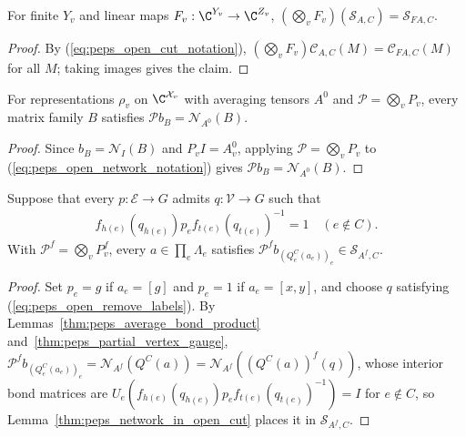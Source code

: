 \begin{lemma}%
    \label{thm:peps_cut_space_physical_image}
    \leanok
    For finite $Y_v$ and linear maps $F_v:\C^{Y_v}\to\C^{Z_v}$,
    $(\bigotimes_v F_v)(\mathcal S_{A,C})=\mathcal S_{FA,C}$.
\end{lemma}
\begin{proof}\leanok
    By (\ref{eq:peps_open_cut_notation}),
    $(\bigotimes_vF_v)\mathcal C_{A,C}(M)=\mathcal C_{FA,C}(M)$ for all $M$;
    taking images gives the claim.
\end{proof}

\begin{lemma}%
    \label{thm:peps_average_bond_product}
    \leanok
    For representations $\rho_v$ on $\C^{\mathcal X_v}$ with averaging tensors
    $A^0$ and $\mathcal P=\bigotimes_v P_v$, every matrix family $B$ satisfies
    $\mathcal P b_B=\mathcal N_{A^0}(B)$.
\end{lemma}
\begin{proof}\leanok
    Since $b_B=\mathcal N_I(B)$ and $P_vI=A_v^0$, applying
    $\mathcal P=\bigotimes_vP_v$ to (\ref{eq:peps_open_network_notation}) gives
    $\mathcal P b_B=\mathcal N_{A^0}(B)$.
\end{proof}

\begin{lemma}%
    \label{thm:peps_open_product_in_cut}
    \leanok
    Suppose that every $p:\mathcal E\to G$ admits $q:\mathcal V\to G$
    such that
    \begin{align}
        f_{h(e)}(q_{h(e)})p_e f_{t(e)}(q_{t(e)})^{-1}=1
        \quad(e\notin C).
        \label{eq:peps_open_remove_labels}
    \end{align}
    With $\mathcal P^f=\bigotimes_vP_v^f$, every
    $a\in\prod_e\Lambda_e$ satisfies
    $\mathcal P^f b_{(Q_e^C(a_e))_e}\in\mathcal S_{A^f,C}$.
\end{lemma}
\begin{proof}\leanok
    Set $p_e=g$ if $a_e=[g]$ and $p_e=1$ if $a_e=[x,y]$, and choose $q$
    satisfying (\ref{eq:peps_open_remove_labels}). By
    Lemmas~\ref{thm:peps_average_bond_product}
    and~\ref{thm:peps_partial_vertex_gauge},
    $\mathcal P^f b_{(Q_e^C(a_e))_e}=\mathcal N_{A^f}(Q^C(a))=\mathcal N_{A^f}((Q^C(a))^f(q))$,
    whose interior bond matrices are
    $U_e(f_{h(e)}(q_{h(e)})p_ef_{t(e)}(q_{t(e)})^{-1})=I$ for $e\notin C$, so
    Lemma~\ref{thm:peps_network_in_open_cut} places it in $\mathcal S_{A^f,C}$.
\end{proof}

